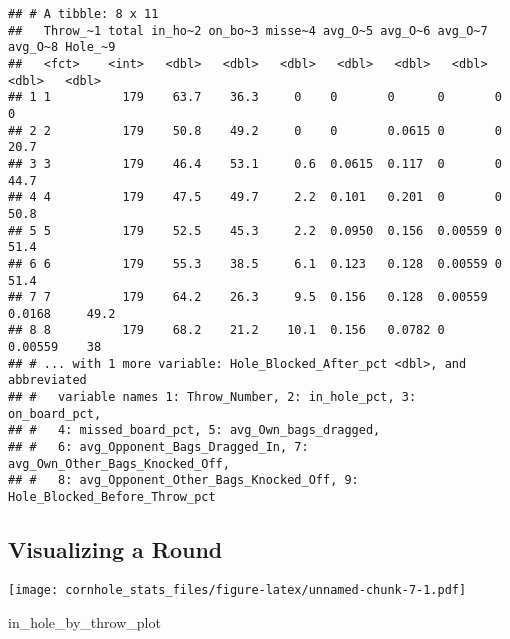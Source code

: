 \documentclass[
]{article}
\newenvironment{Shaded}{\begin{snugshade}}{\end{snugshade}}
\newcommand{\AttributeTok}[1]{\textcolor[rgb]{0.77,0.63,0.00}{#1}}
\newcommand{\FunctionTok}[1]{\textcolor[rgb]{0.00,0.00,0.00}{#1}}
\newcommand{\NormalTok}[1]{#1}
\newcommand{\OtherTok}[1]{\textcolor[rgb]{0.56,0.35,0.01}{#1}}
\newcommand{\SpecialCharTok}[1]{\textcolor[rgb]{0.00,0.00,0.00}{#1}}
\newcommand{\StringTok}[1]{\textcolor[rgb]{0.31,0.60,0.02}{#1}}
\begin{document}
\begin{verbatim}
## # A tibble: 8 x 11
##   Throw_~1 total in_ho~2 on_bo~3 misse~4 avg_O~5 avg_O~6 avg_O~7 avg_O~8 Hole_~9
##   <fct>    <int>   <dbl>   <dbl>   <dbl>   <dbl>   <dbl>   <dbl>   <dbl>   <dbl>
## 1 1          179    63.7    36.3     0    0       0      0       0           0  
## 2 2          179    50.8    49.2     0    0       0.0615 0       0          20.7
## 3 3          179    46.4    53.1     0.6  0.0615  0.117  0       0          44.7
## 4 4          179    47.5    49.7     2.2  0.101   0.201  0       0          50.8
## 5 5          179    52.5    45.3     2.2  0.0950  0.156  0.00559 0          51.4
## 6 6          179    55.3    38.5     6.1  0.123   0.128  0.00559 0          51.4
## 7 7          179    64.2    26.3     9.5  0.156   0.128  0.00559 0.0168     49.2
## 8 8          179    68.2    21.2    10.1  0.156   0.0782 0       0.00559    38  
## # ... with 1 more variable: Hole_Blocked_After_pct <dbl>, and abbreviated
## #   variable names 1: Throw_Number, 2: in_hole_pct, 3: on_board_pct,
## #   4: missed_board_pct, 5: avg_Own_bags_dragged,
## #   6: avg_Opponent_Bags_Dragged_In, 7: avg_Own_Other_Bags_Knocked_Off,
## #   8: avg_Opponent_Other_Bags_Knocked_Off, 9: Hole_Blocked_Before_Throw_pct
\end{verbatim}

\hypertarget{visualizing-a-round}{%
\subsection{Visualizing a Round}\label{visualizing-a-round}}

\begin{Shaded}
\end{Shaded}

\texttt{[image: cornhole\_stats\_files/figure-latex/unnamed-chunk-7-1.pdf]}

\begin{Shaded}
\begin{Highlighting}[]
\NormalTok{in\_hole\_by\_throw\_plot}
\end{Highlighting}
\end{Shaded}
\end{document}
